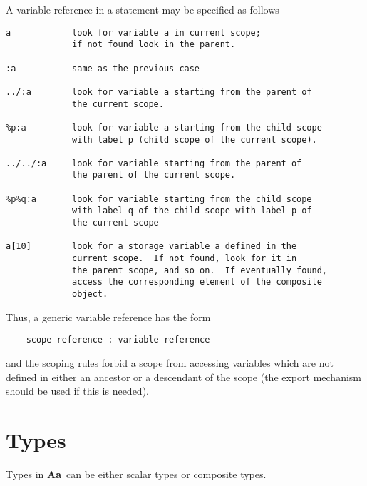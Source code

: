 \documentclass{article}
\newcommand{\Aa}{{\bf Aa}~}
\begin{document}
A variable reference in a statement may be specified 
as follows
\begin{verbatim}
a            look for variable a in current scope; 
             if not found look in the parent.

:a           same as the previous case

../:a        look for variable a starting from the parent of
             the current scope.

%p:a         look for variable a starting from the child scope 
             with label p (child scope of the current scope).

../../:a     look for variable starting from the parent of
             the parent of the current scope.

%p%q:a       look for variable starting from the child scope 
             with label q of the child scope with label p of 
             the current scope

a[10]        look for a storage variable a defined in the 
             current scope.  If not found, look for it in
             the parent scope, and so on.  If eventually found, 
             access the corresponding element of the composite
             object.
\end{verbatim}
Thus, a generic variable reference has the form 
\begin{verbatim} 
    scope-reference : variable-reference 
\end{verbatim} 
and the scoping rules forbid a scope from accessing variables
which are not defined in either an ancestor or a descendant
of the scope (the export mechanism should be used if this
is needed).

\section{Types} \label{sec:Types}

Types in \Aa can be either scalar types or composite types.
\end{document}
